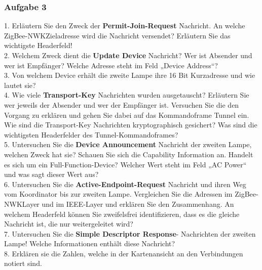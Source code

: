     \subsubsection{Aufgabe 3}
    \begin{Fragen}
        1. Erläutern Sie den Zweck der \textbf{Permit-Join-Request} Nachricht. An welche ZigBee-NWKZieladresse wird die Nachricht versendet? 
        Erläutern Sie das wichtigste Headerfeld!\\
        
        2. Welchem Zweck dient die \textbf{Update Device} Nachricht? Wer ist Absender und wer ist
        Empfänger? Welche Adresse steht im Feld „Device Address“?\\
        
        3. Von welchem Device erhält die zweite Lampe ihre 16 Bit Kurzadresse und wie lautet sie?\\
        
        4. Wie viele \textbf{Transport-Key} Nachrichten wurden ausgetauscht? Erläutern Sie wer jeweils
        der Absender und wer der Empfänger ist. Versuchen Sie die den Vorgang zu erklären und
        gehen Sie dabei auf das Kommandoframe \grqq Tunnel\grqq{} ein. Wie sind die Transport-Key Nachrichten kryptographisch gesichert?
        Was sind die wichtigsten Headerfelder des Tunnel-Kommandoframes?\\
        
        5. Untersuchen Sie die \textbf{Device Announcement} Nachricht der zweiten Lampe, welchen
        Zweck hat sie? Schauen Sie sich die \grqq Capability Information \grqq{} an. Handelt es sich um ein
        Full-Function-Device? Welcher Wert steht im Feld „AC Power“ und was sagt dieser Wert aus? \\
        
        6. Untersuchen Sie die \textbf{Active-Endpoint-Request} Nachricht und ihren Weg vom
        Koordinator bis zur zweiten Lampe. Vergleichen Sie die Adressen im ZigBee-NWKLayer und im IEEE-Layer und erklären Sie den Zusammenhang. An welchem Headerfeld
        können Sie zweifelsfrei identifizieren, dass es die gleiche Nachricht ist, die nur weitergeleitet wird? \\
        
        7. Untersuchen Sie die \textbf{Simple Descriptor Response}- Nachrichten der zweiten Lampe!
        Welche Informationen enthält diese Nachricht? \\

        8. Erklären sie die Zahlen, welche in der Kartenansicht an den Verbindungen notiert sind.\\
        \end{Fragen}

